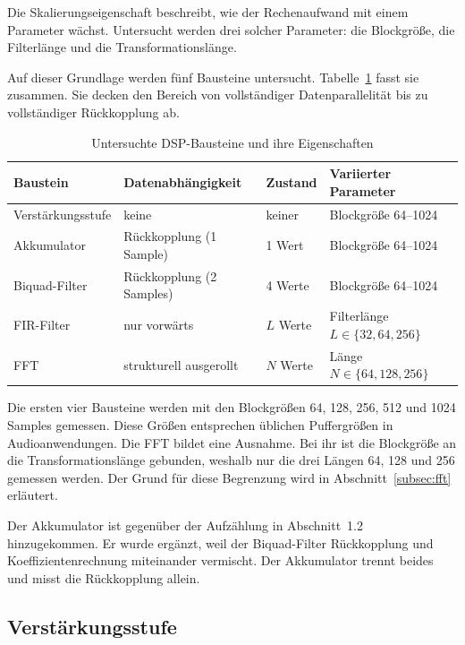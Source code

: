 Die Skalierungseigenschaft beschreibt, wie der Rechenaufwand mit einem
Parameter wächst. Untersucht werden drei solcher Parameter: die Blockgröße,
die Filterlänge und die Transformationslänge.

Auf dieser Grundlage werden fünf Bausteine untersucht.
Tabelle~\ref{tab:bausteine} fasst sie zusammen. Sie decken den Bereich von
vollständiger Datenparallelität bis zu vollständiger Rückkopplung ab.

\begin{table}[htb]
\centering
\caption{Untersuchte DSP-Bausteine und ihre Eigenschaften}
\label{tab:bausteine}
\begin{tabular}{llll}
\hline
Baustein & Datenabhängigkeit & Zustand & Variierter Parameter \\
\hline
Verstärkungsstufe & keine & keiner & Blockgröße 64--1024 \\
Akkumulator & Rückkopplung (1 Sample) & 1 Wert & Blockgröße 64--1024 \\
Biquad-Filter & Rückkopplung (2 Samples) & 4 Werte & Blockgröße 64--1024 \\
FIR-Filter & nur vorwärts & $L$ Werte & Filterlänge $L \in \{32, 64, 256\}$ \\
FFT & strukturell ausgerollt & $N$ Werte & Länge $N \in \{64, 128, 256\}$ \\
\hline
\end{tabular}
\end{table}

Die ersten vier Bausteine werden mit den Blockgrößen 64, 128, 256, 512 und
1024 Samples gemessen. Diese Größen entsprechen üblichen Puffergrößen in
Audioanwendungen. Die FFT bildet eine Ausnahme. Bei ihr ist die Blockgröße an
die Transformationslänge gebunden, weshalb nur die drei Längen 64, 128 und
256 gemessen werden. Der Grund für diese Begrenzung wird in
Abschnitt~\ref{subsec:fft} erläutert.

Der Akkumulator ist gegenüber der Aufzählung in Abschnitt~1.2 hinzugekommen.
Er wurde ergänzt, weil der Biquad-Filter Rückkopplung und
Koeffizientenrechnung miteinander vermischt. Der Akkumulator trennt beides
und misst die Rückkopplung allein.


\subsection{Verstärkungsstufe}

